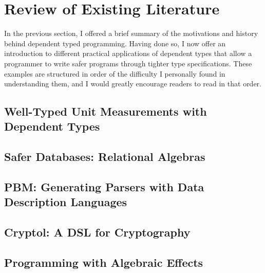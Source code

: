 \chapter{Review of Existing Literature}

In the previous section, I offered a brief summary of the motivations and
history behind dependent typed programming. Having done so, I now offer an
introduction to different practical applications of dependent types that allow a
programmer to write safer programs through tighter type specifications. These
examples are structured in order of the difficulty I personally found in
understanding them, and I would greatly encourage readers to read in that order.

\section{Well-Typed Unit Measurements with Dependent Types}



\newpage

\section{Safer Databases: Relational Algebras}



\newpage


\section{PBM: Generating Parsers with Data Description Languages}



\newpage

\section{Cryptol: A DSL for Cryptography}



\newpage

\section{Programming with Algebraic Effects}


